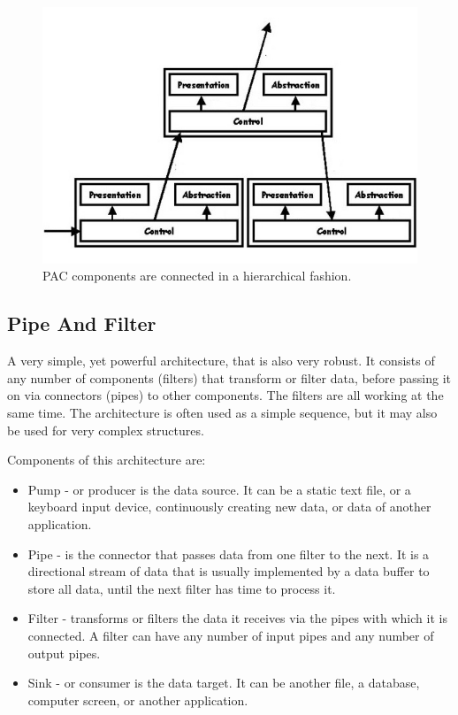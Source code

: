 \documentclass{article}
\begin{document}
\begin{figure}[h]
\centering
\includegraphics[scale=0.65]{pac.jpg}
\caption{PAC components are connected in a hierarchical fashion.}
\label{fig_pac}
\end{figure}



\subsection{Pipe And Filter}
A very simple, yet powerful architecture, that is also very robust. It consists of any number of components (filters) that transform or filter data, before passing it on via connectors (pipes) to other components. The filters are all working at the same time. The architecture is often used as a simple sequence, but it may also be used for very complex structures.

\noindent Components of this architecture are:
\begin{itemize}

\item Pump - or producer is the data source. It can be a static text file, or a keyboard input device, continuously creating new data, or data of another application.
\item Pipe - is the connector that passes data from one filter to the next. It is a directional stream of data that is usually implemented by a data buffer to store all data, until the next filter has time to process it.
\item Filter - transforms or filters the data it receives via the pipes with which it is connected. A filter can have any number of input pipes and any number of output pipes.
\item Sink - or consumer is the data target. It can be another file, a database, computer screen, or another application.\\\\

\end{itemize}
\end{document}
